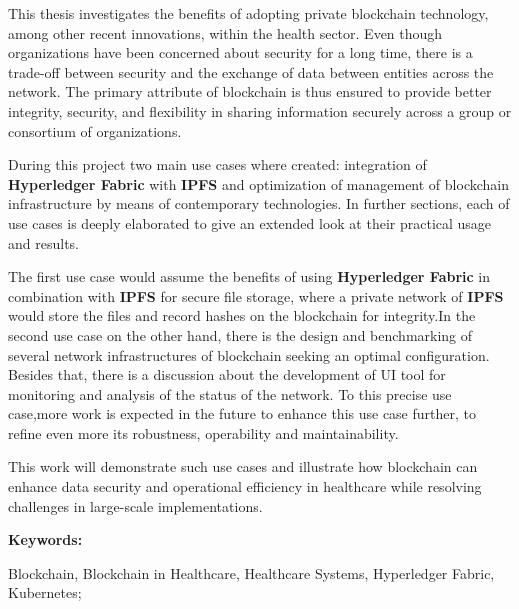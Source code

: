 This thesis investigates the benefits of adopting private blockchain technology, among other recent innovations, within the health sector. Even though organizations have been concerned about security for a long time, there is a trade-off between security and the exchange of data between entities across the network. The primary attribute of blockchain is thus ensured to provide better integrity, security, and flexibility in sharing information securely across a group or consortium of organizations.

During this project two main use cases where created: integration of \textbf{Hyperledger Fabric} with \textbf{IPFS}  and optimization of management of blockchain infrastructure by means of contemporary technologies. In further sections, each of use cases is deeply elaborated to give an extended look at their practical usage and results.

The first use case would assume the benefits of using \textbf{Hyperledger Fabric} in combination with \textbf{IPFS} for secure file storage, where a private network of \textbf{IPFS} would store the files and record hashes on the blockchain for integrity.In the second use case on the other hand, there is the design and benchmarking of several network infrastructures of blockchain seeking an optimal configuration. Besides that, there is a discussion about the development of UI tool for monitoring and analysis of the status of the network. To this precise use case,more work is expected in the future to enhance this use case further, to refine even more its robustness, operability and maintainability.

This work will demonstrate such use cases and illustrate how blockchain can enhance data security and operational efficiency in healthcare while resolving challenges in large-scale implementations.

\vspace{1cm} %
\textbf{Keywords:} \parbox[t]{0.6\textwidth}{\raggedright Blockchain, Blockchain in Healthcare, Healthcare Systems, Hyperledger Fabric, Kubernetes;}
\medskip

\pagebreak
